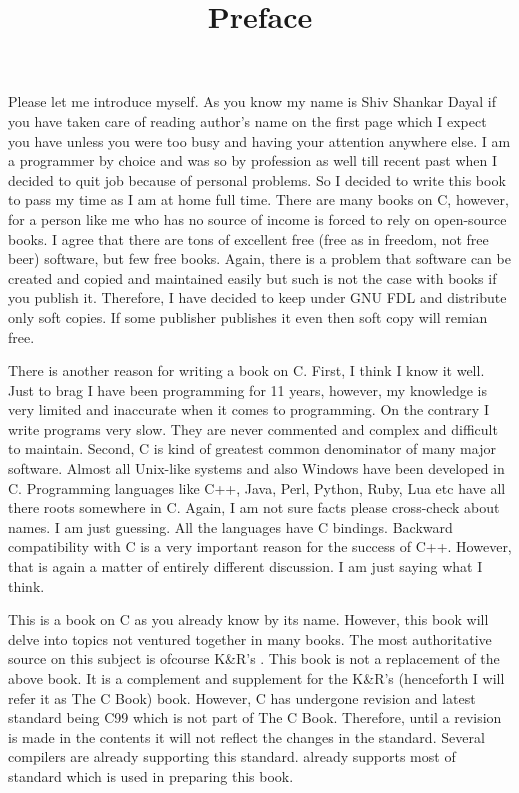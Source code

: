 


\title{Preface}
Please let me introduce myself. As you know my name is Shiv Shankar Dayal if
you have taken care of reading author's name on the first page which I expect
you have unless you were too busy and having your attention anywhere else.
I am a programmer by choice and was so by profession as well till recent past
when I decided to quit job because of personal problems. So I decided to write
this book to pass my time as I am at home full time. There are many books on C,
however, for a person like me who has no source of income is forced to rely
on open-source books. I agree that there are tons of excellent free (free as in
freedom, not free beer) software, but few free books. Again, there is a problem
that software can be created and copied and maintained easily but such is not
the case with books if you publish it. Therefore, I have decided to keep under
GNU FDL and distribute only soft copies. If some publisher publishes it even
then soft copy will remian free.

There is another reason for writing a book on C. First, I think I know it well.
Just to brag I have been programming for 11 years, however, my knowledge is
very limited and inaccurate when it comes to programming. On the contrary I
write programs very slow. They are never commented and complex and difficult
to maintain. Second, C is kind of greatest common denominator of many major
software. Almost all Unix-like systems and also Windows have been developed
in C. Programming languages like C++, Java, Perl, Python, Ruby, Lua etc have all
there roots somewhere in C. Again, I am not sure facts please cross-check
about names. I am just guessing. All the languages have C bindings. Backward
compatibility with C is a very important reason for the success of C++.
However, that is again a matter of entirely different discussion. I am just
saying what I think.

This is a book on C as you already know by its name. However, this book will
delve into topics not ventured together in many books. The most authoritative
source on this subject is ofcourse K\&R's . This book is not a replacement of the above book. It is a complement
and supplement for the K\&R's (henceforth I will refer it as The C Book) book.
However, C has undergone revision and latest standard being C99 which is not
part of The C Book. Therefore, until a revision is made in the contents it
will not reflect the changes in the standard. Several compilers are already
supporting this standard.  already supports most of standard which is
used in preparing this book.

